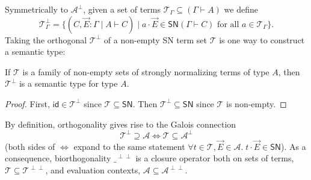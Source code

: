 \documentclass[a4paper,USenglish,cleveref, autoref, thm-restate]{lipics-v2019}
\newcommand{\tid}{\mathsf{id}}
\newcommand{\A}{\mathcal{A}}
\newcommand{\T}{\mathcal{T}}
\newcommand{\SN}{\mathsf{SN}}
\begin{document}
\noindent
Symmetrically to $\A^\perp$, given a set of terms $\T_\Gamma \subseteq
(\Gamma \vdash A)$ we define
\[
  \T_\Gamma^\perp =
  \{ (C, \vec E : \Gamma \mid A \vdash C) \mid
  a \cdot \vec E \in \SN(\Gamma \vdash C)
  \mbox{ for all } a \in \T_\Gamma \}
  .
\]
Taking the orthogonal $\T^\perp$ of a non-empty SN term set $\T$ is one way to
construct a semantic type:
\begin{lemma}
  \label{lem:orthsem}
  If $\T$ is a family of non-empty sets of strongly normalizing terms
  of type $A$, then
  $\T^\perp$ is a semantic type for type $A$.
\end{lemma}
\begin{proof}
  First, $\tid \in \T^\perp$ since $\T \subseteq \SN$.
  Then $\T^\perp \subseteq \SN$ since $\T$ is non-empty.
\end{proof}
%
By definition, orthogonality gives rise to the Galois
connection
\[
  \T^\perp \supseteq \A \iff \T \subseteq \A^\perp
\]
(both sides of $\iff$ expand to the same statement $\forall t \in \T,
\vec E \in \A.\; t \cdot \vec E \in \SN$).  As a consequence,
biorthogonality $\_^{\perp\perp}$ is a closure operator both on sets
of terms, $\T \subseteq \T^{\perp\perp}$, and evaluation contexts,
$\A \subseteq \A^{\perp\perp}$.
\end{document}
